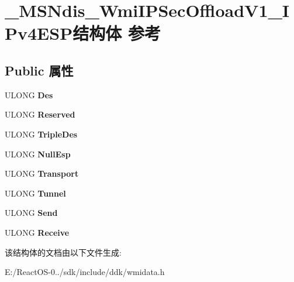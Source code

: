 \hypertarget{struct___m_s_ndis___wmi_i_p_sec_offload_v1___i_pv4_e_s_p}{}\section{\+\_\+\+M\+S\+Ndis\+\_\+\+Wmi\+I\+P\+Sec\+Offload\+V1\+\_\+\+I\+Pv4\+E\+S\+P结构体 参考}
\label{struct___m_s_ndis___wmi_i_p_sec_offload_v1___i_pv4_e_s_p}
\subsection*{Public 属性}
\begin{DoxyCompactItemize}
\item 
\mbox{\label{struct___m_s_ndis___wmi_i_p_sec_offload_v1___i_pv4_e_s_p_afcbdfb8fa19a3bbfd7cd89910de47b4b}} 
U\+L\+O\+NG {\bfseries Des}
\item 
\mbox{\label{struct___m_s_ndis___wmi_i_p_sec_offload_v1___i_pv4_e_s_p_a36f8c012bdfb94a2e80e2618c31458c5}} 
U\+L\+O\+NG {\bfseries Reserved}
\item 
\mbox{\label{struct___m_s_ndis___wmi_i_p_sec_offload_v1___i_pv4_e_s_p_a6afa66c8acfa0923266ef57dc64d0f10}} 
U\+L\+O\+NG {\bfseries Triple\+Des}
\item 
\mbox{\label{struct___m_s_ndis___wmi_i_p_sec_offload_v1___i_pv4_e_s_p_ac472f6f860bbdc917afe399acfcb7fc4}} 
U\+L\+O\+NG {\bfseries Null\+Esp}
\item 
\mbox{\label{struct___m_s_ndis___wmi_i_p_sec_offload_v1___i_pv4_e_s_p_a8bf8d5138a2c0aa91016ad7627c2aae0}} 
U\+L\+O\+NG {\bfseries Transport}
\item 
\mbox{\label{struct___m_s_ndis___wmi_i_p_sec_offload_v1___i_pv4_e_s_p_a242338b4a6b8773d86cdae17abdc632c}} 
U\+L\+O\+NG {\bfseries Tunnel}
\item 
\mbox{\label{struct___m_s_ndis___wmi_i_p_sec_offload_v1___i_pv4_e_s_p_ac13afb2cf6e45da2205f601cdf2ffb15}} 
U\+L\+O\+NG {\bfseries Send}
\item 
\mbox{\label{struct___m_s_ndis___wmi_i_p_sec_offload_v1___i_pv4_e_s_p_a29cfbd33b4c5a5e7fb0bd15d53ec033c}} 
U\+L\+O\+NG {\bfseries Receive}
\end{DoxyCompactItemize}


该结构体的文档由以下文件生成\+:\begin{DoxyCompactItemize}
\item 
E\+:/\+React\+O\+S-\/0../sdk/include/ddk/wmidata.\+h\end{DoxyCompactItemize}
